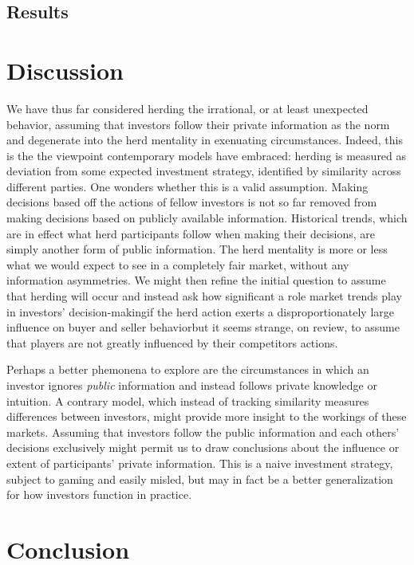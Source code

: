 \documentclass{article}
\begin{document}
\subsection{Results}

\section{Discussion}
We have thus far considered herding the irrational, or at least unexpected behavior, assuming that investors follow their private information as the norm and degenerate into the herd mentality in exenuating circumstances.
Indeed, this is the the viewpoint contemporary models have embraced: herding is measured as deviation from some expected investment strategy, identified by similarity across different parties. 
One wonders whether this is a valid assumption. 
Making decisions based off the actions of fellow investors is not so far removed from making decisions based on publicly available information.
Historical trends, which are in effect what herd participants follow when making their decisions, are simply another form of public information. 
The herd mentality is more or less what we would expect to see in a completely fair market, without any information asymmetries. 
We might then refine the initial question to assume that herding will occur and instead ask how significant a role market trends play in investors' decision-making\textemdash if the herd action exerts a disproportionately large influence on buyer and seller behavior\textemdash but it seems strange, on review, to assume that players are not greatly influenced by their competitors actions.

Perhaps a better phemonena to explore are the circumstances in which an investor ignores \emph{public} information and instead follows private knowledge or intuition.
A contrary model, which instead of tracking similarity measures differences between investors, might provide more insight to the workings of these markets.  
Assuming that investors follow the public information and each others' decisions exclusively might permit us to draw conclusions about the influence or extent of participants' private information.
This is a naive investment strategy, subject to gaming and easily misled, but may in fact be a better generalization for how investors function in practice.


\section{Conclusion}



\end{document}
